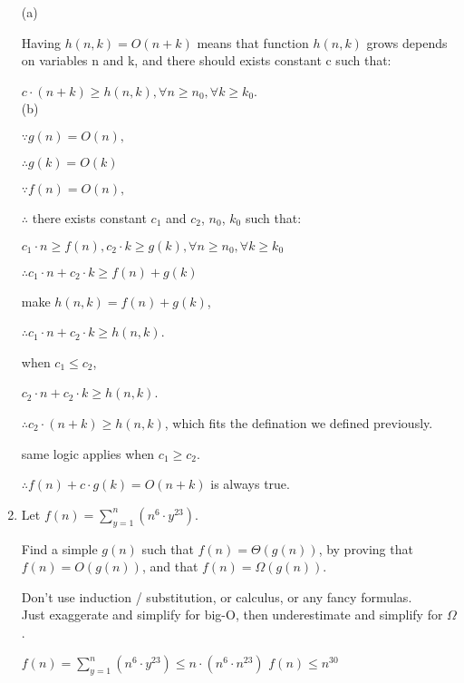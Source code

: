 \documentclass[12pt]{article}
\begin{document}
\begin{enumerate}
{\color{blue}{\bf Answer:\\}}

(a)

Having $h(n,k) = O(n+k)$ means that function $h(n,k)$ grows depends on variables n and k, and there should exists constant c such that:

$c \cdot (n+k) \geq h(n,k) ,  \forall n \geq n_0, \forall k \geq k_0$.
\\

(b) 

$\because g(n) = O(n),$

$\therefore g(k) = O(k)$

$\because f(n) = O(n),$

$\therefore$ there exists constant $c_1$ and $c_2$, $n_0$, $k_0$ such that:

$c_1\cdot n \geq f(n), c_2\cdot k \geq g(k), \forall n \geq n_0, \forall k \geq k_0$

$\therefore c_1 \cdot n + c_2 \cdot k \geq f(n) + g(k)$

make $h(n,k) = f(n) + g(k)$,

$\therefore c_1 \cdot n + c_2 \cdot k \geq h(n,k)$.

when $c_1 \leq c_2$,

$ c_2 \cdot n + c_2 \cdot k \geq h(n,k)$.

$\therefore c_2 \cdot(n+k) \geq h(n,k)$, which fits the defination we defined previously.

same logic applies when $c_1 \geq c_2$.

$\therefore f(n) + c\cdot g(k) = O(n+k)$ is always true.






\newpage



\item  
Let $f(n) = \sum^n_{y{=}1} (n^6\cdot y^{23})$. 

Find a simple $g(n)$ such that $f(n) = \Theta(g(n))$, by proving that 
$f(n)=O(g(n))$, and that $f(n) = \Omega(g(n))$.

Don't use induction / substitution, or calculus, or any fancy formulas.  \\
Just exaggerate and simplify for big-O, then underestimate and simplify for $\Omega$.\\


{\color{blue}{\bf Answer:\\}}

$f(n) = \sum^n_{y{=}1} (n^6\cdot y^{23}) \leq n \cdot (n^6 \cdot n^{23})$
$f(n) \leq  n^{30}$


\end{enumerate}
\end{document}
